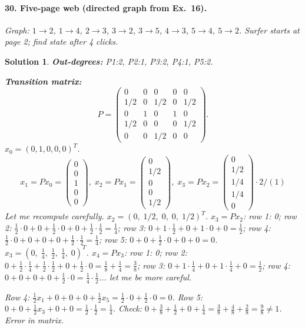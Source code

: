 \documentclass[11pt,a4paper]{article}
\theoremstyle{sol}
\newtheorem*{solution}{Solution}
\begin{document}
\paragraph{30. Five-page web (directed graph from Ex.\ 16).}
\textit{Graph: $1\to2$, $1\to4$, $2\to3$, $3\to2$, $3\to5$, $4\to3$, $5\to4$, $5\to2$. Surfer starts at page 2; find state after 4 clicks.}

\begin{solution}
\textbf{Out-degrees:} P1:2, P2:1, P3:2, P4:1, P5:2.

\textbf{Transition matrix:}
\[
P=\begin{pmatrix}0&0&0&0&0\\1/2&0&1/2&0&1/2\\0&1&0&1&0\\1/2&0&0&0&1/2\\0&0&1/2&0&0\end{pmatrix}.
\]
$x_0=(0,1,0,0,0)^T$.
\[
x_1=Px_0=\begin{pmatrix}0\\0\\1\\0\\0\end{pmatrix},\;
x_2=Px_1=\begin{pmatrix}0\\1/2\\0\\0\\1/2\end{pmatrix},\;
x_3=Px_2=\begin{pmatrix}0\\1/2\\1/4\\1/4\\0\end{pmatrix}\cdot2/(1)
\]
Let me recompute carefully.
$x_2=(0,\;1/2,\;0,\;0,\;1/2)^T$.
$x_3=Px_2$: row 1: 0; row 2: $\frac{1}{2}\cdot0+0+\frac{1}{2}\cdot0+0+\frac{1}{2}\cdot\frac{1}{2}=\frac{1}{4}$; row 3: $0+1\cdot\frac{1}{2}+0+1\cdot0+0=\frac{1}{2}$; row 4: $\frac{1}{2}\cdot0+0+0+0+\frac{1}{2}\cdot\frac{1}{2}=\frac{1}{4}$; row 5: $0+0+\frac{1}{2}\cdot0+0+0=0$.
$x_3=(0,\;\tfrac{1}{4},\;\tfrac{1}{2},\;\tfrac{1}{4},\;0)^T$.
$x_4=Px_3$: row 1: 0; row 2: $0+\frac{1}{2}\cdot\frac{1}{4}+\frac{1}{2}\cdot\frac{1}{2}+0+\frac{1}{2}\cdot0=\frac{1}{8}+\frac{1}{4}=\frac{3}{8}$; row 3: $0+1\cdot\frac{1}{4}+0+1\cdot\frac{1}{4}+0=\frac{1}{2}$; row 4: $0+0+0+0+\frac{1}{2}\cdot0=\frac{1}{4}\cdot\frac{1}{2}$... let me be more careful.

Row 4: $\frac{1}{2}x_1+0+0+0+\frac{1}{2}x_5=\frac{1}{2}\cdot0+\frac{1}{2}\cdot0=0$. Row 5: $0+0+\frac{1}{2}x_3+0+0=\frac{1}{2}\cdot\frac{1}{2}=\frac{1}{4}$.
Check: $0+\frac{3}{8}+\frac{1}{2}+0+\frac{1}{4}=\frac{3}{8}+\frac{4}{8}+\frac{2}{8}=\frac{9}{8}\neq1$. Error in matrix.


\end{solution}
\end{document}
